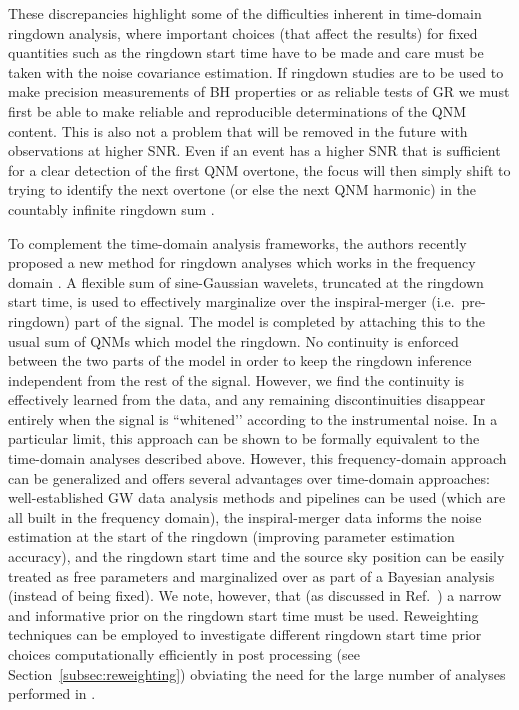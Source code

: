 These discrepancies highlight some of the difficulties inherent in time-domain ringdown analysis, where important choices (that affect the results) for fixed quantities such as the ringdown start time have to be made and care must be taken with the noise covariance estimation.
If ringdown studies are to be used to make precision measurements of BH properties or as reliable tests of GR we must first be able to make reliable and reproducible determinations of the QNM content.
This is also not a problem that will be removed in the future with observations at higher SNR. Even if an event has a higher SNR that is sufficient for a clear detection of the first QNM overtone, the focus will then simply shift to trying to identify the next overtone (or else the next QNM harmonic) in the countably infinite ringdown sum \cite{Bustillo:2020buq}.

To complement the time-domain analysis frameworks, the authors recently proposed a new method for ringdown analyses which works in the frequency domain \cite{Finch:2021qph}.
A flexible sum of sine-Gaussian wavelets, truncated at the ringdown start time, is used to effectively marginalize over the inspiral-merger (i.e.\ pre-ringdown) part of the signal.
The model is completed by attaching this to the usual sum of QNMs which model the ringdown.
No continuity is enforced between the two parts of the model in order to keep the ringdown inference independent from the rest of the signal.
However, we find the continuity is effectively learned from the data, and any remaining discontinuities disappear entirely when the signal is ``whitened’’ according to the instrumental noise.
In a particular limit, this approach can be shown to be formally equivalent to the time-domain analyses described above.
However, this frequency-domain approach can be generalized and offers several advantages over time-domain approaches:
well-established GW data analysis methods and pipelines can be used (which are all built in the frequency domain), 
the inspiral-merger data informs the noise estimation at the start of the ringdown (improving parameter estimation accuracy), 
and the ringdown start time and the source sky position can be easily treated as free parameters and marginalized over as part of a Bayesian analysis (instead of being fixed).
We note, however, that (as discussed in Ref.~\cite{Finch:2021qph}) a narrow and informative prior on the ringdown start time must be used.
Reweighting techniques can be employed to investigate different ringdown start time prior choices computationally efficiently in post processing (see Section~\ref{subsec:reweighting}) obviating the need for the large number of analyses performed in \cite{Cotesta:2022pci, Isi:2022mhy}.

